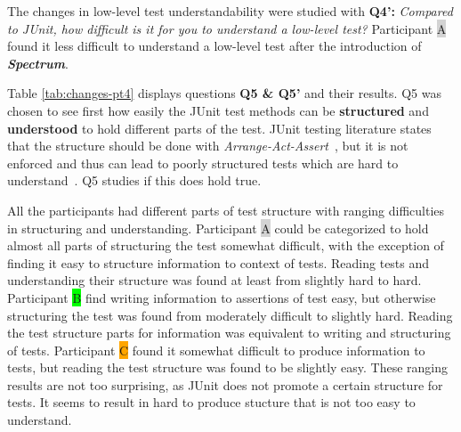 The changes in low-level test understandability were studied with \textbf{Q4':} \textit{Compared to JUnit, how difficult is it
for you to understand a low-level test?} Participant {\colorbox{lightgray}A} found it less difficult to understand a low-level
test after the introduction of \textbf{\textit{Spectrum}}.

Table \ref{tab:changes-pt4} displays questions \textbf{Q5 \& Q5'} and their results. Q5 was chosen to see first
how easily the JUnit test methods can be \textbf{structured} and \textbf{understood} to hold different parts of the test. JUnit testing literature states that
the structure should be done with \textit{Arrange-Act-Assert}~\cite{langr2015pragmatic}, but it is not enforced and thus can lead to poorly structured
tests which are hard to understand~\cite{kapelonis2016java}. Q5 studies if this does hold true.

All the participants had different parts of test
structure with ranging difficulties in structuring and understanding. Participant {\colorbox{lightgray}A} could be categorized to hold almost all
parts of structuring the test somewhat difficult, with the exception of finding it easy to structure information to context of tests.
Reading tests and understanding their structure was found at least from slightly hard to hard.
Participant {\colorbox{lime}B} find writing information to assertions of test easy, but otherwise structuring the test
was found from moderately difficult to slightly hard. Reading the test structure parts for information was equivalent
to writing and structuring of tests. Participant {\colorbox{orange}C} found it somewhat difficult to produce information
to tests, but reading the test structure was found to be slightly easy. These ranging results are not too surprising,
as JUnit does not promote a certain structure for tests. It seems to result in hard to produce stucture that is not
too easy to understand.


